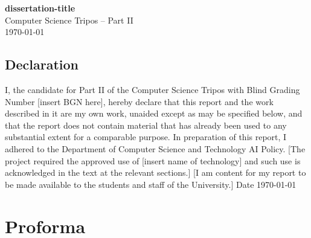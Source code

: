 \documentclass[12pt,a4paper,twoside,openright]{report}
\begin{document}


\pagestyle{empty}


\vspace*{60mm}
\begin{center}
\Huge
\textbf{dissertation-title} \\[5mm]
Computer Science Tripos -- Part II \\[5mm]
\today  %
\end{center}

 
\newpage
\section*{Declaration}

I, the candidate for Part II of the Computer Science Tripos with Blind Grading Number [insert BGN here], hereby declare that this report and the work described in it are my own work, unaided except as may be specified below, and that the report does not contain material that has already been used to any substantial extent for a comparable purpose. In preparation of this report, I adhered to the Department of Computer Science and Technology AI Policy. [The project required the approved use of [insert name of technology] and such use is acknowledged in the text at the relevant sections.] [I am content for my report to be made available to the students and staff of the University.]
Date \today

\medskip
{}



\chapter*{Proforma}
\end{document}
